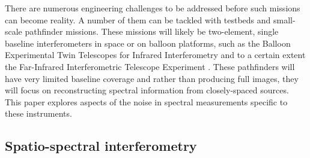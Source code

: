 There are numerous engineering challenges to be addressed before such missions can become reality. A number of them can be tackled with testbeds \citep[e.g.][]{Leisawitz:2012ik, 2012ApOpt..51.2202G} and small-scale pathfinder missions. These missions 
will likely be two-element, single baseline interferometers in space or on balloon platforms,
such as the Balloon Experimental Twin Telescopes for Infrared Interferometry \cite[BETTII;][]{Rinehart:2014gk} and to a certain extent the Far-Infrared Interferometric Telescope Experiment \cite[FITE;][]{Kato:2010jf}.  
These pathfinders will have very limited baseline coverage and
rather than producing full images, they will focus on reconstructing 
spectral information from closely-spaced sources. This paper explores
aspects of the noise in spectral measurements specific to these instruments.

\subsection{Spatio-spectral interferometry}

